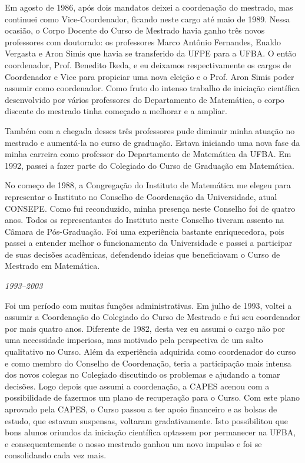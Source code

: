 \documentclass{hipatia}
\begin{document}
Em agosto de 1986, após dois mandatos deixei a coordenação
do mestrado, mas continuei como Vice-Coordenador, ficando
neste cargo até maio de 1989. Nessa ocasião, o Corpo Docente
do Curso de Mestrado havia ganho três novos professores com
doutorado: os professores Marco Antônio Fernandes, Enaldo
Vergasta e Aron Simis que havia se transferido da UFPE para
a UFBA. O então coordenador, Prof. Benedito Ikeda, e eu
deixamos respectivamente os cargos de Coordenador e Vice
para propiciar uma nova eleição e o Prof. Aron Simis poder
assumir como coordenador. Como fruto do intenso trabalho de
iniciação científica desenvolvido por vários professores do
Departamento de Matemática, o corpo discente do mestrado
tinha começado a melhorar e a ampliar.

Também com a chegada desses três professores pude diminuir
minha atuação no mestrado e aumentá-la no curso de
graduação. Estava iniciando uma nova fase da minha carreira
como professor do Departamento de Matemática da UFBA. Em
1992, passei a fazer parte do Colegiado do Curso de Graduação
em Matemática.

No começo de 1988, a Congregação do Instituto de Matemática
me elegeu para representar o Instituto no Conselho de
Coordenação da Universidade, atual CONSEPE. Como fui
reconduzido, minha presença neste Conselho foi de quatro
anos. Todos os representantes do Instituto neste Conselho
tiveram assento na Câmara de Pós-Graduação. Foi uma
experiência bastante enriquecedora, pois passei a entender
melhor o funcionamento da Universidade e passei a participar
de suas decisões acadêmicas, defendendo ideias que
beneficiavam o Curso de Mestrado em Matemática. 



\begin{center}\emph{1993--2003}\end{center}


Foi um período com muitas funções administrativas. Em julho
de 1993, voltei a assumir a Coordenação do Colegiado do
Curso de Mestrado e fui seu coordenador por mais quatro
anos. Diferente de 1982, desta vez eu assumi o cargo não por
uma necessidade imperiosa, mas motivado pela perspectiva de
um salto qualitativo no Curso. Além da experiência adquirida
como coordenador do curso e como membro do Conselho de
Coordenação, teria a participação mais intensa dos novos
colegas no Colegiado discutindo os problemas e ajudando a
tomar decisões. Logo depois que assumi a coordenação, a
CAPES acenou com a possibilidade de fazermos um plano de
recuperação para o Curso. Com este plano aprovado pela
CAPES, o Curso passou a ter apoio financeiro e as bolsas de
estudo, que estavam suspensas, voltaram gradativamente. Isto
possibilitou que bons alunos oriundos da iniciação
científica optassem por permanecer na UFBA, e
consequentemente o nosso mestrado ganhou um novo impulso e
foi se consolidando cada vez mais.
\end{document}
